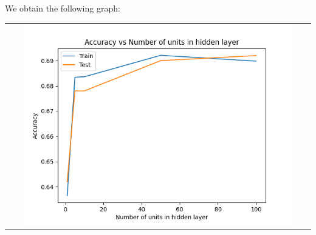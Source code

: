 \begin{enumerate}[label=(\alph*)]
\begin{enumerate}[label=\roman*.]
    \end{enumerate}
    We obtain the following graph:
    \begin{center}
        \begin{tabular}{c}
            \includegraphics[width=0.9\textwidth]{../Q2/Graphs/part_b.png}
        \end{tabular}
    \end{center}


\end{enumerate}
